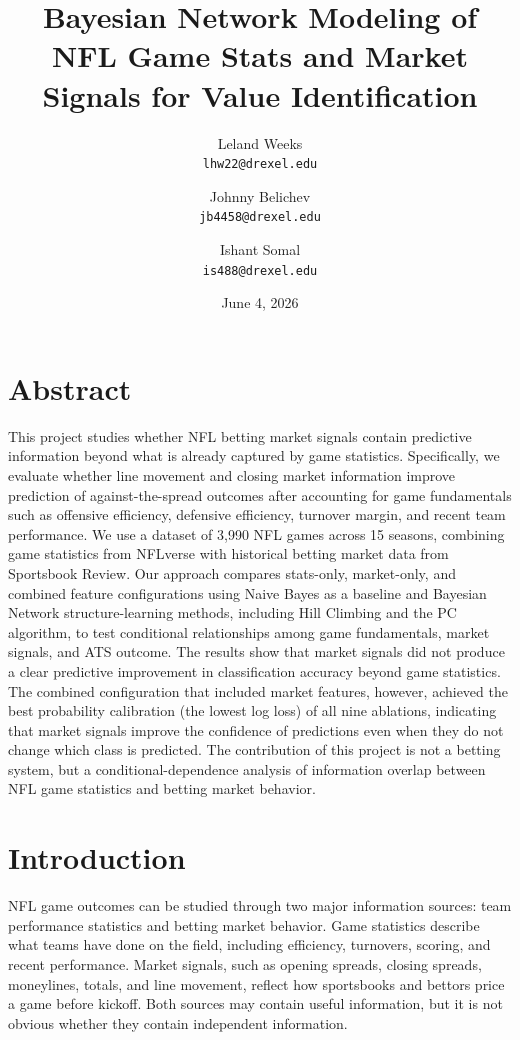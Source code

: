 \documentclass[letterpaper]{article}
\title{\textbf{Bayesian Network Modeling of NFL Game Stats and Market Signals for Value Identification}}
\author{
  Leland Weeks\\
  \texttt{lhw22@drexel.edu}
  \and
  Johnny Belichev\\
  \texttt{jb4458@drexel.edu}
  \and
  Ishant Somal\\
  \texttt{is488@drexel.edu}
}
\date{June 4, 2026}
\begin{document}
\maketitle


\section{Abstract}

This project studies whether NFL betting market signals contain predictive information beyond what is already captured by game statistics. Specifically, we evaluate whether line movement and closing market information improve prediction of against-the-spread outcomes after accounting for game fundamentals such as offensive efficiency, defensive efficiency, turnover margin, and recent team performance. We use a dataset of 3,990 NFL games across 15 seasons, combining game statistics from NFLverse with historical betting market data from Sportsbook Review. Our approach compares stats-only, market-only, and combined feature configurations using Naive Bayes as a baseline and Bayesian Network structure-learning methods, including Hill Climbing and the PC algorithm, to test conditional relationships among game fundamentals, market signals, and ATS outcome. The results show that market signals did not produce a clear predictive improvement in classification accuracy beyond game statistics. The combined configuration that included market features, however, achieved the best probability calibration (the lowest log loss) of all nine ablations, indicating that market signals improve the confidence of predictions even when they do not change which class is predicted.  The contribution of this project is not a betting system, but a conditional-dependence analysis of information overlap between NFL game statistics and betting market behavior. 

\section{Introduction}

NFL game outcomes can be studied through two major information sources: team performance statistics and betting market behavior. Game statistics describe what teams have done on the field, including efficiency, turnovers, scoring, and recent performance. Market signals, such as opening spreads, closing spreads, moneylines, totals, and line movement, reflect how sportsbooks and bettors price a game before kickoff. Both sources may contain useful information, but it is not obvious whether they contain independent information. 
\end{document}
